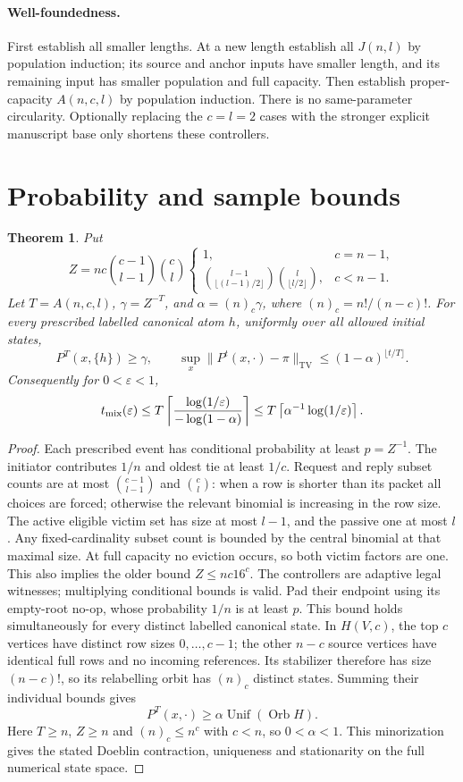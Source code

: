 \documentclass[11pt]{article}
\newtheorem{theorem}{Theorem}
\newcommand{\TV}{\mathrm{TV}}
\begin{document}
\paragraph{Well-foundedness.}
First establish all smaller lengths. At a new length establish all $J(n,l)$
by population induction; its source and anchor inputs have smaller length,
and its remaining input has smaller population and full capacity. Then
establish proper-capacity $A(n,c,l)$ by population induction. There is no
same-parameter circularity. Optionally replacing the $c=l=2$ cases with the
stronger explicit manuscript base only shortens these controllers.

\section{Probability and sample bounds}
\begin{theorem}
Put
\[
 Z=nc\binom{c-1}{l-1}\binom cl
 \begin{cases}
 1,&c=n-1,\\
 \displaystyle\binom{l-1}{\lfloor(l-1)/2\rfloor}
 \binom l{\lfloor l/2\rfloor},&c<n-1.
 \end{cases}
\]
Let $T=A(n,c,l)$, $\gamma=Z^{-T}$, and
$\alpha=(n)_c\gamma$, where $(n)_c=n!/(n-c)!$. For every prescribed labelled
canonical atom $h$, uniformly over all allowed initial states,
\[
 P^T(x,\{h\})\ge\gamma,\qquad
 \sup_x\|P^t(x,\cdot)-\pi\|_{\TV}
 \le(1-\alpha)^{\lfloor t/T\rfloor}.
\]
Consequently for $0<\varepsilon<1$,
\[
 t_{\rm mix}(\varepsilon)
 \le T\left\lceil\frac{\log(1/\varepsilon)}{-\log(1-\alpha)}\right\rceil
 \le T\left\lceil\alpha^{-1}\log(1/\varepsilon)\right\rceil.
\]
\end{theorem}
\begin{proof}
Each prescribed event has conditional probability at least $p=Z^{-1}$.
The initiator contributes $1/n$ and oldest tie at least $1/c$. Request and
reply subset counts are at most $\binom{c-1}{l-1}$ and $\binom cl$:
when a row is shorter than its packet all choices are forced; otherwise
the relevant binomial is increasing in the row size. The active eligible
victim set has size at most $l-1$, and the passive one at most $l$.
Any fixed-cardinality subset count is bounded by the central binomial at
that maximal size. At full capacity no eviction occurs, so both victim
factors are one. This also implies the older bound $Z\le nc16^c$.
The controllers
are adaptive legal witnesses; multiplying conditional bounds is valid.
Pad their endpoint using its empty-root no-op, whose probability $1/n$
is at least $p$. This bound holds simultaneously for every distinct labelled canonical state.
In $H(V,c)$, the top $c$ vertices have distinct row sizes $0,\ldots,c-1$;
the other $n-c$ source vertices have identical full rows and no incoming
references. Its stabilizer therefore has size $(n-c)!$, so its relabelling
orbit has $(n)_c$ distinct states. Summing their individual bounds gives
\[
 P^T(x,\cdot)\ge\alpha\operatorname{Unif}(\operatorname{Orb}H).
\]
Here $T\ge n$, $Z\ge n$ and $(n)_c\le n^c$ with $c<n$, so
$0<\alpha<1$. This minorization gives the stated Doeblin
contraction, uniqueness and stationarity on the full numerical state space.
\end{proof}
\end{document}
